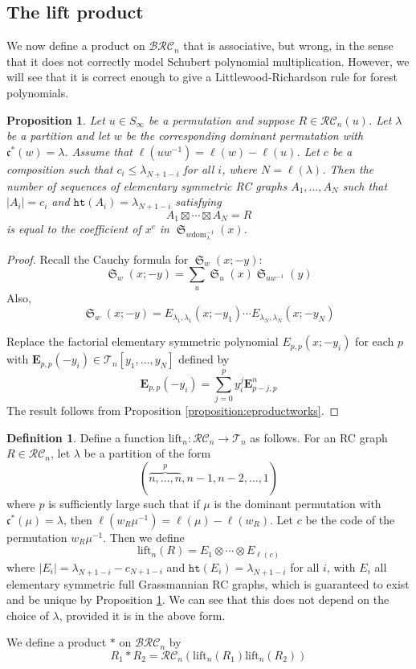 \documentclass{amsart}
\newtheorem{proposition}[lemma]{Proposition}
\theoremstyle{definition}
\newtheorem{definition}[lemma]{Definition}
\theoremstyle{remark}
\numberwithin{equation}{subsection}
\DeclareMathOperator{\sch}{\mathfrak{S}}
\newcommand{\wof}[1]{w_{#1}}
\newcommand{\hr}{\mathtt{ht}}
\newcommand{\BRC}{\mathcal{BRC}}
\newcommand{\RC}{\mathcal{RC}}
\newcommand{\code}{\mathfrak{c}}
\begin{document}
\subsection{The lift product}

We now define a product on $\BRC_n$ that is associative, but wrong, in the sense that it does not correctly model Schubert polynomial multiplication. However, we will see that it is correct enough to give a Littlewood-Richardson rule for forest polynomials.

\begin{proposition} \label{proposition:elemfactor}
  Let $u\in S_\infty$ be a permutation and suppose $R\in \RC_n(u)$. Let $\lambda$ be a partition and let $w$ be the corresponding dominant permutation with $\code^*(w)=\lambda$. Assume that $\ell(uw^{-1}) = \ell(w)-\ell(u)$. Let $c$ be a composition such that $c_i\leq \lambda_{N + 1 - i}$ for all $i$, where $N=\ell(\lambda)$. Then the number of sequences of elementary symmetric RC graphs $A_1,\ldots,A_N$ such that $|A_i| = c_i$ and $\hr(A_i) = \lambda_{N + 1 - i}$ satisfying
  $$A_1\boxtimes\cdots\boxtimes A_N = R$$
is equal to the coefficient of $x^c$ in $\sch_{w\mathrm{dom}_\lambda^{-1}}(x)$.
\end{proposition}
\begin{proof}
  Recall the Cauchy formula for $\sch_w(x;-y)$:
  $$\sch_w(x;-y)=\sum_u \sch_u(x)\sch_{uw^{-1}}(y)$$
  Also,
  $$\sch_w(x;-y) = E_{\lambda_1,\lambda_1}(x;-y_1)\cdots E_{\lambda_N,\lambda_N}(x;-y_N)$$

Replace the factorial elementary symmetric polynomial $E_{p,p}(x;-y_i)$ for each $p$ with $\mathbf{E}_{p,p}(-y_i)\in \mathcal{T}_n[y_1,\ldots,y_N]$ defined by
$$\mathbf{E}_{p,p}(-y_i) = \sum_{j=0}^p y_i^j \mathbf{E}_{p-j,p}^n$$
The result follows from Proposition \ref{proposition:eproductworks}.
\end{proof}



\begin{definition}
  Define a function $\mathrm{lift}_n:\RC_n\to \mathcal{T}_n$ as follows. For an RC graph $R\in \RC_n$, let $\lambda$ be a partition of the form 
$$(\overbrace{n,\ldots,n}^{p},n-1,n-2,\ldots,1)$$
where $p$ is sufficiently large such that if $\mu$ is the dominant permutation with $\code^*(\mu)=\lambda$, then $\ell(\wof{R}\mu^{-1}) = \ell(\mu) - \ell(\wof{R})$.  Let $c$ be the code of the permutation $\wof{R}\mu^{-1}$. Then we define
$$\mathrm{lift}_n(R) = E_1\otimes \cdots \otimes E_{\ell(c)}$$
where $|E_i| = \lambda_{N + 1 - i} - c_{N + 1 - i}$ and $\hr(E_i) = \lambda_{N+1-i}$ for all $i$, with $E_i$ all elementary symmetric full Grassmannian RC graphs, which is guaranteed to exist and be unique by Proposition \ref{proposition:elemfactor}. We can see that this does not depend on the choice of $\lambda$, provided it is in the above form.

We define a product $*$ on $\BRC_n$ by
$$R_1*R_2 = \RC_n(\mathrm{lift}_n(R_1)\mathrm{lift}_n(R_2))$$
\end{definition}
\end{document}
